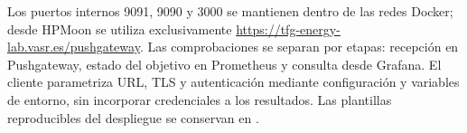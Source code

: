 Los puertos internos 9091, 9090 y 3000 se mantienen dentro de las redes Docker; desde HPMoon se utiliza exclusivamente \url{https://tfg-energy-lab.vasr.es/pushgateway}. Las comprobaciones se separan por etapas: recepción en Pushgateway, estado del objetivo en Prometheus y consulta desde Grafana. El cliente parametriza URL, TLS y autenticación mediante configuración y variables de entorno, sin incorporar credenciales a los resultados. Las plantillas reproducibles del despliegue se conservan en .
